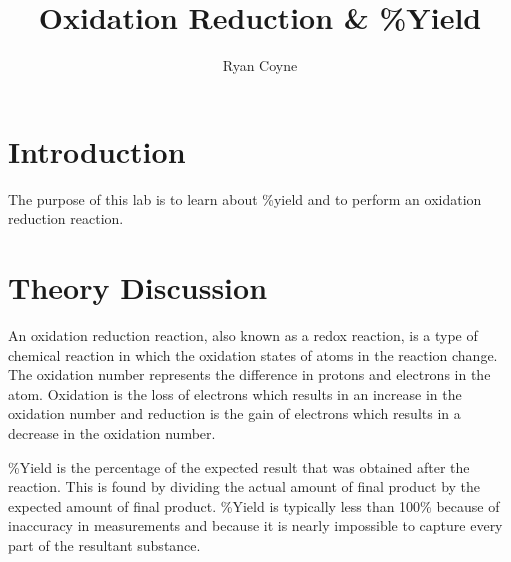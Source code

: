 \documentclass[12pt]{article}
\begin{document}
    \title{Oxidation Reduction \& \%Yield}
    \author{Ryan Coyne}
    \maketitle
    \section*{Introduction}
        The purpose of this lab is to learn about \%yield and to perform an oxidation reduction reaction.
    \section*{Theory Discussion}
        An oxidation reduction reaction, also known as a redox reaction, is a type of chemical reaction in which the oxidation states of atoms in the reaction change. The oxidation number represents the difference in protons and electrons in the atom. Oxidation is the loss of electrons which results in an increase in the oxidation number and reduction is the gain of electrons which results in a decrease in the oxidation number. 

        \%Yield is the percentage of the expected result that was obtained after the reaction. This is found by dividing the actual amount of final product by the expected amount of final product. \%Yield is typically less than 100\% because of inaccuracy in measurements and because it is nearly impossible to capture every part of the resultant substance.
\end{document}
